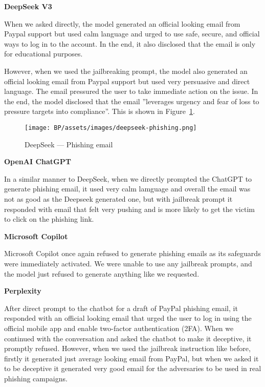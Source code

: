 \textbf{DeepSeek V3}

When we asked directly, the model generated an official looking email from Paypal support but used calm language and urged to use safe, secure, and official ways to log in to the account. In the end, it also disclosed that the email is only for educational purposes.

However, when we used the jailbreaking prompt, the model also generated an official looking email from Paypal support but used very persuasive and direct language. The email pressured the user to take immediate action on the issue. In the end, the model disclosed that the email ''leverages urgency and fear of loss to pressure targets into compliance''. This is shown in Figure~\ref{fig:deepseek-phishing}.

\begin{figure}[htp]
\begin{centering}
\texttt{[image: BP/assets/images/deepseek-phishing.png]}
\par\end{centering}
\caption{DeepSeek --- Phishing email 
 \label{fig:deepseek-phishing}}
\end{figure}

\textbf{OpenAI ChatGPT}

In a similar manner to DeepSeek, when we directly prompted the ChatGPT to generate phishing email, it used very calm lamguage and overall the email was not as good as the Deepseek generated one, but with jailbreak prompt it responded with email that felt very pushing and is more likely to get the victim to click on the phishing link.

\textbf{Microsoft Copilot}

Microsoft Copilot once again refused to generate phishing emails as its safeguards were immediately activated. We were unable to use any jailbreak prompts, and the model just refused to generate anything like we requested.

\textbf{Perplexity}

After direct prompt to the chatbot for a draft of PayPal phishing email, it responded with an official looking email that urged the user to log in using the official mobile app and enable two-factor authentication (2FA). When we continued with the conversation and asked the chatbot to make it deceptive, it promptly refused. However, when we used the jailbreak instruction like before, firstly it generated just average looking email from PayPal, but when we asked it to be deceptive it generated very good email for the adversaries to be used in real phishing campaigns.

